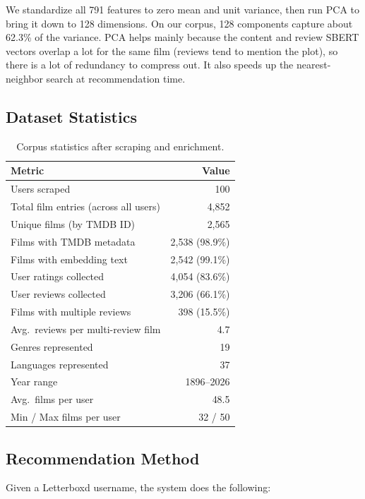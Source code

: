 \documentclass[sigconf,nonacm]{acmart}
\begin{document}
We standardize all 791 features to zero mean and unit variance, then run PCA to bring it down to 128 dimensions. On our corpus, 128 components capture about 62.3\% of the variance. PCA helps mainly because the content and review SBERT vectors overlap a lot for the same film (reviews tend to mention the plot), so there is a lot of redundancy to compress out. It also speeds up the nearest-neighbor search at recommendation time.

\subsection{Dataset Statistics}

\begin{table}[h]
\begin{tabular}{lr}
\toprule
Metric & Value \\
\midrule
Users scraped & 100 \\
Total film entries (across all users) & 4,852 \\
Unique films (by TMDB ID) & 2,565 \\
Films with TMDB metadata & 2,538 (98.9\%) \\
Films with embedding text & 2,542 (99.1\%) \\
\midrule
User ratings collected & 4,054 (83.6\%) \\
User reviews collected & 3,206 (66.1\%) \\
Films with multiple reviews & 398 (15.5\%) \\
Avg.\ reviews per multi-review film & 4.7 \\
\midrule
Genres represented & 19 \\
Languages represented & 37 \\
Year range & 1896--2026 \\
\midrule
Avg.\ films per user & 48.5 \\
Min / Max films per user & 32 / 50 \\
\bottomrule
\end{tabular}
\caption{Corpus statistics after scraping and enrichment.}
\end{table}

\subsection{Recommendation Method}

Given a Letterboxd username, the system does the following:
\end{document}
